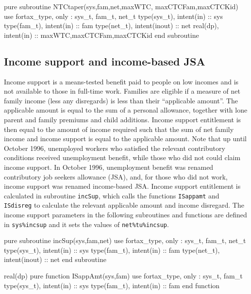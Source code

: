 \documentclass[11pt,thmsa,letter,ukenglish]{article}
\begin{document}

\begin{fortrancode}
pure subroutine NTCtaper(sys,fam,net,maxWTC, maxCTCFam,maxCTCKid)
    use fortax_type, only : sys_t, fam_t, net_t
    type(sys_t), intent(in)    :: sys
    type(fam_t), intent(in)    :: fam
    type(net_t), intent(inout) :: net
    real(dp),    intent(in)    :: maxWTC,maxCTCFam,maxCTCKid
end subroutine
\end{fortrancode}

\subsection{Income support and income-based JSA}
Income support is a means-tested benefit paid to people on low incomes and is not available to those in full-time work. Families are eligible if a measure of net family income (less any disregards) is less than their ``applicable amount''. The applicable amount is equal to the sum of a personal allowance, together with lone parent and family premiums and child additions. Income support entitlement is then equal to the amount of income required such that the sum of net family income and income support is equal to the applicable amount. Note that up until October 1996, unemployed workers who satisfied the relevant contributory conditions received unemployment benefit, while those who did not could claim income support. In October 1996, unemployment benefit was renamed contributory job seekers allowance (JSA), and, for those who did not work, income support was renamed income-based JSA. Income support entitlement is calculated in subroutine \texttt{incSup}, which calls the functions \texttt{ISappamt} and \texttt{ISdisreg} to calculate the relevant applicable amount and income disregard. The income support parameters in the following subroutines and functions are defined in \texttt{sys\%incsup} and it sets the values of \texttt{net\%tu\%incsup}.

\begin{fortrancode}
pure subroutine incSup(sys,fam,net)
    use fortax_type, only : sys_t, fam_t, net_t
    type(sys_t), intent(in)    :: sys
    type(fam_t), intent(in)    :: fam
    type(net_t), intent(inout) :: net
end subroutine
\end{fortrancode}

\begin{fortrancode}
real(dp) pure function ISappAmt(sys,fam)
    use fortax_type, only : sys_t, fam_t
    type(sys_t), intent(in)    :: sys
    type(fam_t), intent(in)    :: fam
end function
\end{fortrancode}
\end{document}

